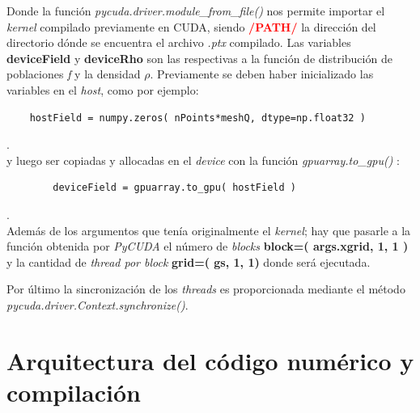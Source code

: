 Donde la función \textit{pycuda.driver.module\_from\_file()} nos permite importar el \textit{kernel} compilado previamente en CUDA, siendo \textcolor{red}{\textbf{/PATH/}} la dirección del directorio dónde se encuentra el archivo \textit{.ptx} compilado. Las variables \textbf{deviceField} y \textbf{deviceRho} son las respectivas a la función de distribución de poblaciones \textit{f} y la densidad $\rho$. Previamente se deben haber inicializado las variables en el \textit{host}, como por ejemplo:
{\footnotesize
	\begin{frame}{}
		\begin{lstlisting}
	hostField = numpy.zeros( nPoints*meshQ, dtype=np.float32 ) 
		\end{lstlisting}
		
	\end{frame}
}.
\\
y luego ser copiadas y allocadas en el  \textit{device} con la función \textit{gpuarray.to\_gpu()} :
{\footnotesize
	\begin{frame}{}
		\begin{lstlisting}
		deviceField = gpuarray.to_gpu( hostField )
		\end{lstlisting}
		
	\end{frame}
}.
\\
Además de los argumentos que tenía originalmente el \textit{kernel}; hay que pasarle a la función obtenida por \textit{PyCUDA} el número de \textit{blocks} \textbf{block=( args.xgrid, 1, 1 )} y la cantidad de \textit{thread por block} \textbf{grid=( gs, 1, 1)} donde será ejecutada. 

Por último la sincronización de los \textit{threads} es proporcionada mediante el método \\
\textit{pycuda.driver.Context.synchronize()}.
	   

\section{Arquitectura del código numérico y compilación}

